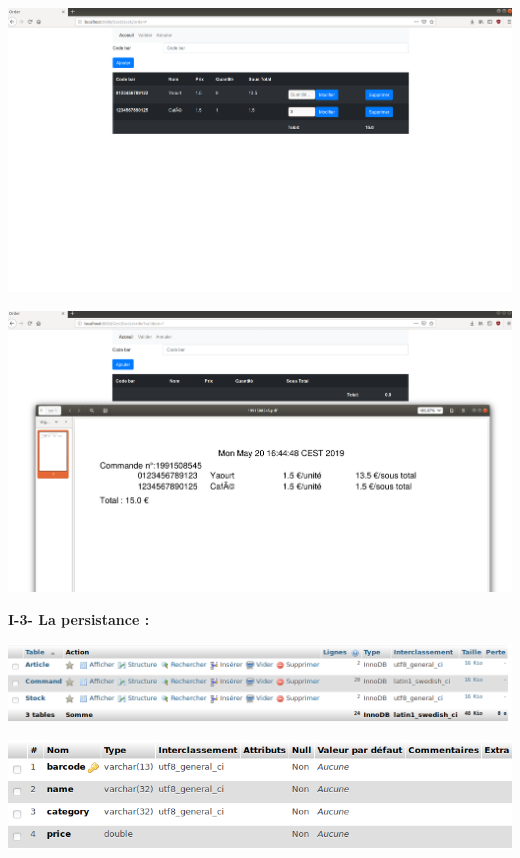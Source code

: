 \documentclass[french,10pt,a4paper]{report}
\begin{document}
\begin{center}
	\includegraphics[scale=0.15]{captures/7.png}
\end{center}
\begin{center}
	\includegraphics[scale=0.15]{captures/8.png}
\end{center}
\textbf{I-3- La persistance :}
\begin{center}
	\includegraphics[scale=0.3]{captures/9.png}
\end{center}
\begin{center}
	\includegraphics[scale=0.4]{captures/article.png}
\end{center}
\end{document}
